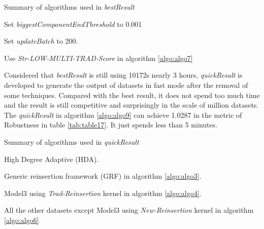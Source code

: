 \documentclass{article}
\begin{document}
	\begin{algorithm}[!htbp]
		\caption{ Summary of algorithms used in \textit{bestResult} }
		\label{algo:algo8}
		\begin{algorithmic}[1]
			\State Set \textit{biggestComponentEndThreshold} to 0.001
			
			\State Set \textit{updateBatch} to 200.
			
			\State Use \textit{Str-LOW-MULTI-TRAD-Score} in algorithm \ref{algo:algo7}
						
			
		\end{algorithmic}
	\end{algorithm}


	Considered that \textit{bestResult} is still using 10172s nearly 3 hours, \textit{quickResult} is developed to generate the output of datasets in fast mode after the removal of some techniques. Compared with the best result, it does not spend too much time and the result is still competitive and surprisingly in the scale of million datasets. The \textit{quickResult} in algorithm \ref{algo:algo9} can achieve 1.0287 in the metric of Robustness in table \ref{tab:table17}. It just spends less than 5 minutes.
	
	
	\begin{algorithm}[!htbp]
		\caption{ Summary of algorithms used in \textit{quickResult} }
		\label{algo:algo9}
		\begin{algorithmic}[1]
			
			\State High Degree Adaptive (HDA).

			\State Generic reinsertion framework (GRF) in algorithm \ref{algo:algo3}.
			
			\State Model3 using \textit{Trad-Reinsertion} kernel in algorithm \ref{algo:algo4}.
			
			\State All the other datasets except Model3 using \textit{New-Reinsertion} kernel in algorithm \ref{algo:algo6}
			
		\end{algorithmic}
	\end{algorithm}
	
	
	
\end{document}
